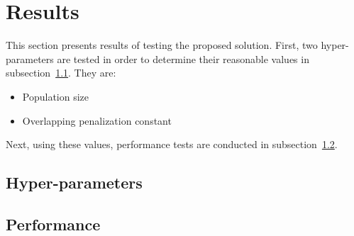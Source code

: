 \section{Results}\label{sec:results}

This section presents results of testing the proposed solution.
First, two hyper-parameters are tested in order to determine their reasonable values in subsection~\ref{subsec:hyper-parameters}.
They are:

\begin{itemize}
    \item Population size
    \item Overlapping penalization constant
\end{itemize}

Next, using these values, performance tests are conducted in subsection~\ref{subsec:performance}.

\subsection{Hyper-parameters}\label{subsec:hyper-parameters}

\subsection{Performance}\label{subsec:performance}



